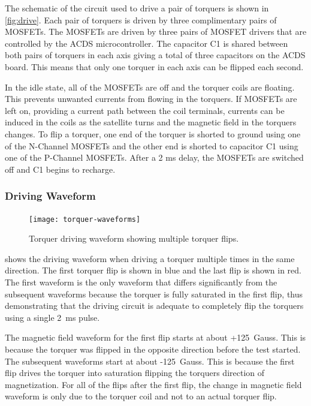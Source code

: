 The schematic of the circuit used to drive a pair of torquers is shown in \cref{fig:drive}. Each pair of torquers is driven by three complimentary pairs of \acp{MOSFET}.  The \acp{MOSFET} are driven by three pairs of \ac{MOSFET} drivers that are controlled by the \ac{ACDS} microcontroller. The capacitor C1 is shared between both pairs of torquers in each axis giving a total of three capacitors on the \ac{ACDS} board. This means that only one torquer in each axis can be flipped each second. 

In the idle state, all of the \acp{MOSFET} are off and the torquer coils are floating. This prevents unwanted currents from flowing in the torquers. If \acp{MOSFET} are left on, providing a current path between the coil terminals, currents can be induced in the coils as the satellite turns and the magnetic field in the torquers changes. To flip a torquer, one end of the torquer is shorted to ground using one of the N-Channel \acp{MOSFET} and the other end is shorted to capacitor C1 using one of the P-Channel \acp{MOSFET}. After a 2 ms delay, the \acp{MOSFET} are switched off and C1 begins to recharge.

\subsubsection{Driving Waveform}

\begin{figure}[htb!]
    \centering
    \texttt{[image: torquer-waveforms]}
    \caption{Torquer driving waveform showing multiple torquer flips.}
    \label{fig:driveWV}
\end{figure}

 shows the driving waveform when driving a torquer multiple times in the same direction. The first torquer flip is shown in blue and the last flip is shown in red. The first waveform is the only waveform that differs significantly from the subsequent waveforms because the torquer is fully saturated in the first flip, thus demonstrating that the driving circuit is adequate to completely flip the torquers using a single 2~ms pulse.

The magnetic field waveform for the first flip starts at about +125~Gauss. This is because the torquer was flipped in the opposite direction before the test started. The subsequent waveforms start at about -125~Gauss. This is because the first flip drives the torquer into saturation flipping the torquers direction of magnetization. For all of the flips after the first flip, the change in magnetic field waveform is only due to the torquer coil and not to an actual torquer flip.

